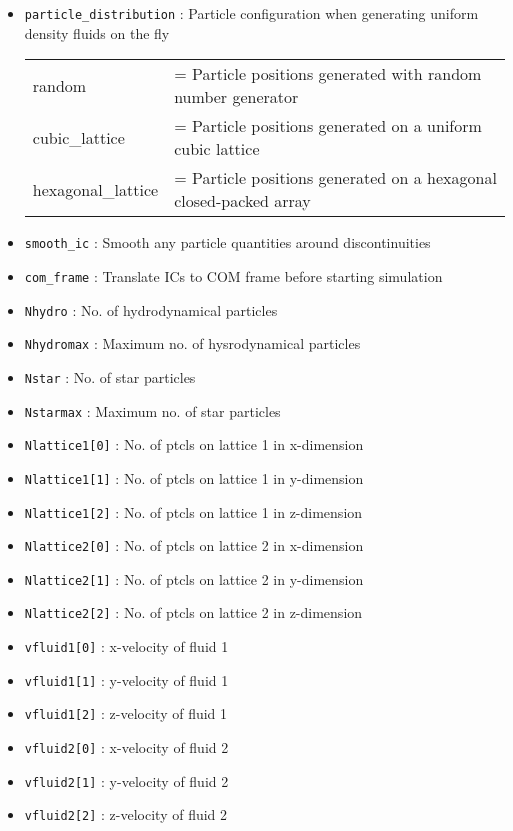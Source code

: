 \documentclass[a4paper]{article}
\newcommand{\var}[1]{\texttt{#1}}
\begin{document}
\begin{itemize}

\item \var{particle\_distribution} : Particle configuration when generating uniform density fluids on the fly \\
\begin{tabular}{ll}
random         &= Particle positions generated with random number generator \\
cubic\_lattice &= Particle positions generated on a uniform cubic lattice \\
hexagonal\_lattice &= Particle positions generated on a hexagonal closed-packed array
\end{tabular}

\item \var{smooth\_ic} : Smooth any particle quantities around discontinuities
\item \var{com\_frame} : Translate ICs to COM frame before starting simulation
\item \var{Nhydro}       : No. of hydrodynamical particles
\item \var{Nhydromax}    : Maximum no. of hysrodynamical particles
\item \var{Nstar}        : No. of star particles
\item \var{Nstarmax}     : Maximum no. of star particles

\item \var{Nlattice1[0]} : No. of ptcls on lattice 1 in x-dimension
\item \var{Nlattice1[1]} : No. of ptcls on lattice 1 in y-dimension
\item \var{Nlattice1[2]} : No. of ptcls on lattice 1 in z-dimension
\item \var{Nlattice2[0]} : No. of ptcls on lattice 2 in x-dimension
\item \var{Nlattice2[1]} : No. of ptcls on lattice 2 in y-dimension
\item \var{Nlattice2[2]} : No. of ptcls on lattice 2 in z-dimension

\item \var{vfluid1[0]}   : x-velocity of fluid 1
\item \var{vfluid1[1]}   : y-velocity of fluid 1
\item \var{vfluid1[2]}   : z-velocity of fluid 1
\item \var{vfluid2[0]}   : x-velocity of fluid 2
\item \var{vfluid2[1]}   : y-velocity of fluid 2
\item \var{vfluid2[2]}   : z-velocity of fluid 2


\end{itemize}
\end{document}
